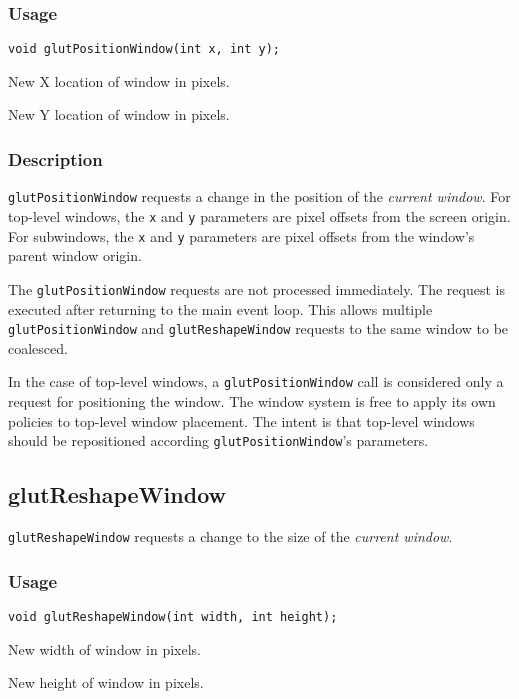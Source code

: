 \subsubsection*{Usage}
\begin{verbatim}
void glutPositionWindow(int x, int y);
\end{verbatim}
\begin{description}
\itemsep 0in
\item[\tt x]
New X location of window in pixels.
\item[\tt y]
New Y location of window in pixels.
\end{description}

\subsubsection*{Description}

{\tt glutPositionWindow} requests a change in the position of
the {\em current window}.
For top-level windows, the {\tt x} and {\tt y} parameters are
pixel offsets from the screen origin.  For subwindows, the
{\tt x} and {\tt y} parameters are pixel offsets from the window's
parent window origin.

The {\tt glutPositionWindow} requests are not processed immediately.
The request is executed after returning to the main event loop.
This allows multiple {\tt glutPositionWindow} and {\tt glutReshapeWindow}
requests to the same window to be coalesced.

In the case of top-level windows, a {\tt glutPositionWindow} call
is considered only a request for positioning the window.
The window system is free to apply its own policies to top-level
window placement.  The intent is that top-level windows
should be repositioned according {\tt glutPositionWindow}'s parameters.

\subsection{glutReshapeWindow}

{\tt glutReshapeWindow} requests a change to the size of
the {\em current window}.

\subsubsection*{Usage}
\begin{verbatim}
void glutReshapeWindow(int width, int height);
\end{verbatim}
\begin{description}
\itemsep 0in
\item[\tt width]
New width of window in pixels.
\item[\tt height]
New height of window in pixels.
\end{description}

